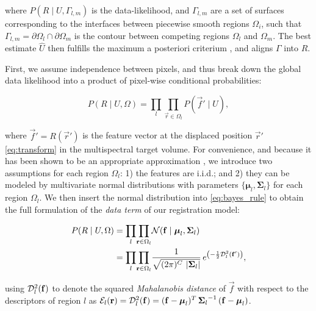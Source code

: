   where $P(R \mid U,\Gamma_{l,m})$ is the data-likelihood, and
  $\Gamma_{l,m}$ are a set of surfaces corresponding to the interfaces
  between piecewise smooth regions $\Omega_i$, such that
  $\Gamma_{l,m} = \partial \Omega_l \cap \partial \Omega_m$ is the
  contour between competing regions $\Omega_l$ and $\Omega_m$.
The best estimate $\hat{U}$ then fulfills the maximum a posteriori criterium
  \citep{bishop_pattern_2006}, and aligns $\Gamma$ into $R$.

First, we assume independence between pixels, and thus break down the
  global data likelihood into a product of pixel-wise conditional probabilities:

  \begin{equation}
  P(R \mid U,\Omega) = \underset{l}{\prod} \underset{\vec{r}\in \Omega_l}{\prod}
    P\left( \vec{f}' \mid U \right),
  \label{eq:bayes_aposteriori}
  \end{equation}

  where $\vec{f}' = R(\vec{r}')$ is the feature vector at the displaced
  position $\vec{r}'$ \eqref{eq:transform} in the multispectral target
  volume.
For convenience, and because it has been shown to be an appropriate approximation
  \citep{leemput_automated_1999,cuadra_comparison_2005}, we introduce two assumptions for each
  region $\Omega_l$:
  1) the features are i.i.d.; and 2) they can be modeled by multivariate normal
  distributions with parameters $\lbrace \boldsymbol{\mu}_l, \boldsymbol{\Sigma}_{l} \rbrace$
  for each region $\Omega_l$.
We then insert the normal distribution into \eqref{eq:bayes_rule} to obtain the full
  formulation of the \emph{data term} of our registration model:

 	\begin{align}
  P( R \mid U, \Omega ) &= \underset{l}{\prod} \underset{\vec{r} \in \Omega_l}{\prod}
  \mathcal{N} ( \vec{f} \mid \boldsymbol{\mu}_l, \boldsymbol{\Sigma}_{l} ) \notag\\
  &= \underset{l}{\prod} \underset{\vec{r} \in \Omega_l}{\prod} \frac{1}{ \sqrt{(2\pi)^{C}\,\left|\boldsymbol{\Sigma}_{l}\right|}}\,{e^{\left(-\frac{1}{2}
  \mdist{f'}{l} \right)}},
  \label{eq:pdf}
  \end{align}

  using $\mdist{f}{l}$ to denote the squared \emph{Mahalanobis distance} of $\vec{f}$ with respect
  to the descriptors of region $l$ as
  $\mathcal{E}_l(\vec{r}) = \mdist{f}{l} = (\vec{f} - \boldsymbol{\mu}_l)^T \, {\boldsymbol{\Sigma}_l}^{-1} \, (\vec{f} - \boldsymbol{\mu}_l)$.


